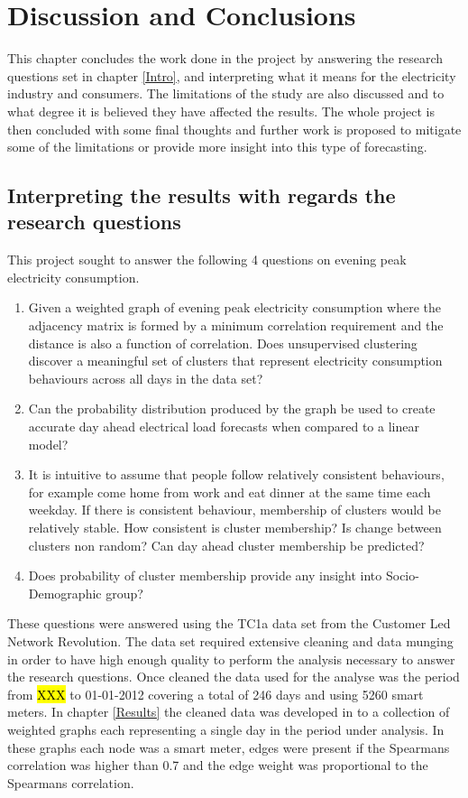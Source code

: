 \chapter{Discussion and Conclusions}
\label{conclusions}

This chapter concludes the work done in the project by answering the research questions set in chapter \ref{Intro}, and interpreting  what it means for the electricity industry and consumers. The limitations of the study are also discussed and to what degree it is believed they have affected the results. The whole project is then concluded with some final thoughts and further work is proposed to mitigate some of the limitations or provide more insight into this type of forecasting.

\section{Interpreting the results with regards the research questions}

This project sought to answer the following 4 questions on evening peak electricity consumption.
\begin{enumerate}
\itemsep0em 
    \item Given a weighted graph of evening peak electricity consumption where the adjacency matrix is formed by a minimum correlation requirement and the distance is also a function of correlation. Does unsupervised clustering discover a meaningful set of clusters that represent electricity consumption behaviours across all days in the data set?
    
    \item Can the probability distribution produced by the graph be used to create accurate day ahead electrical load forecasts when compared to a linear model?
    
    \item It is intuitive to assume that people follow relatively consistent behaviours, for example come home from work and eat dinner at the same time each weekday. If there is consistent behaviour, membership of clusters would be relatively stable. How consistent is cluster membership? Is change between clusters non random? Can day ahead cluster membership be predicted?

    \item Does probability of cluster membership provide any insight into Socio-Demographic group?
\end{enumerate}

These questions were answered using the TC1a data set from the Customer Led Network Revolution. The data set required extensive cleaning and data munging in order to have high enough quality to perform the analysis necessary to answer the research questions. Once cleaned the data used for the analyse was the period from \hl{XXX} to 01-01-2012 covering a total of 246 days and using 5260 smart meters.  
In chapter \ref{Results} the cleaned data was developed in to a collection of weighted graphs each representing a single day in the period under analysis. In these graphs each node was a smart meter, edges were present if the Spearmans correlation was higher than 0.7 and the edge weight was proportional to the Spearmans correlation. 

